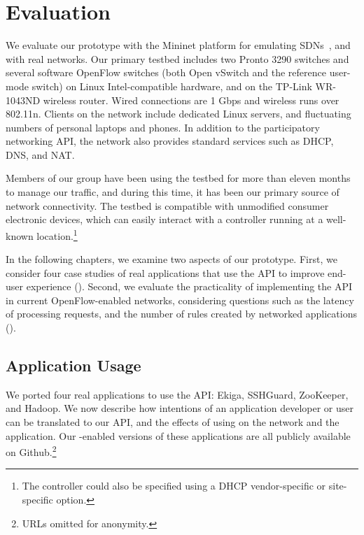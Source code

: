 \chapter{Evaluation}
\label{sec:Evaluation}


We evaluate our \sys prototype with the Mininet platform for
emulating SDNs~\cite{Mininet}, and with real networks. Our primary
testbed includes two Pronto 3290 switches %
and several software OpenFlow switches (both Open vSwitch and the
reference user-mode switch) %
on Linux Intel-compatible
hardware, and on the TP-Link WR-1043ND wireless router.  Wired
connections are 1 Gbps and wireless runs over 802.11n. Clients on
the network include dedicated Linux servers, and fluctuating numbers
of personal laptops and phones. In addition to the participatory
networking API, the network also provides standard services such as
DHCP, DNS, and NAT.

Members of our group have been using the testbed for more than
eleven months to manage our traffic, and during this time, it has
been our primary source of network connectivity. The testbed is
compatible with unmodified consumer electronic devices, which can
easily interact with a \sys controller running at a well-known
location.\footnote{The \sys controller could also be specified using
a DHCP vendor-specific or site-specific option.}

In the following chapters, we examine two aspects of our prototype.
First, we consider four case studies of real applications
that use the \sys API to improve end-user experience
().  Second, we evaluate the practicality
of implementing the \sys API in current OpenFlow-enabled networks,
considering questions such as the latency of processing requests,
and the number of rules created by networked applications
().

\section{Application Usage}
\label{sec:ApplicationUsage}

We ported four real applications to use the \sys API: Ekiga,
SSHGuard, ZooKeeper, and Hadoop. We now describe how intentions of
an application developer or user can be translated to our API, and
the effects of using \sys on the network and the application. Our
\sys-enabled versions of these applications are all publicly
available on Github.\footnote{URLs omitted for anonymity.} 

